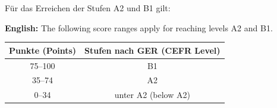 \documentclass[a4paper]{article}
\begin{document}
        Für das Erreichen der Stufen A2 und B1 gilt:
        
        \textbf{English:} The following score ranges apply for reaching levels A2 and B1.
        
        \begin{table}[H]
            \centering
            \begin{tabular}{|c|c|}
                \hline
                Punkte (Points) & Stufen nach GER (CEFR Level) \\
                \hline
                75--100         & B1                           \\
                35--74          & A2                           \\
                0--34           & unter A2 (below A2)          \\
                \hline
            \end{tabular}
        \end{table}
\end{document}
